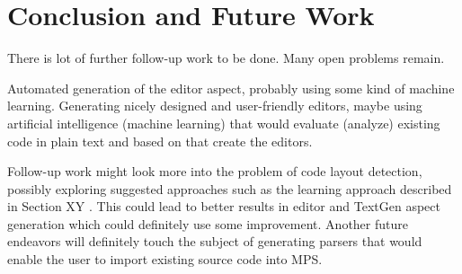 \section{Conclusion and Future Work}


There is lot of further follow-up work to be done. Many open problems remain.

Automated generation of the editor aspect, probably using some kind of machine learning.
Generating nicely designed and user-friendly editors, maybe using artificial intelligence (machine learning) that would evaluate (analyze) existing code in plain text and based on that create the editors.

Follow-up work might look more into the problem of code layout detection, possibly exploring suggested approaches such as the learning approach described in Section XY .
This could lead to better results in editor and TextGen aspect generation which could definitely use some improvement.
Another future endeavors will definitely touch the subject of generating parsers that would enable the user to import existing source code into MPS.